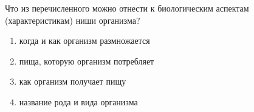 
Что из перечисленного можно отнести к биологическим аспектам (характеристикам) ниши организма?

\begin{enumerate}
    \item когда и как организм размножается
    \item пища, которую организм потребляет
    \item как организм получает пищу
    \item название рода и вида организма
\end{enumerate}

\explanationSection

